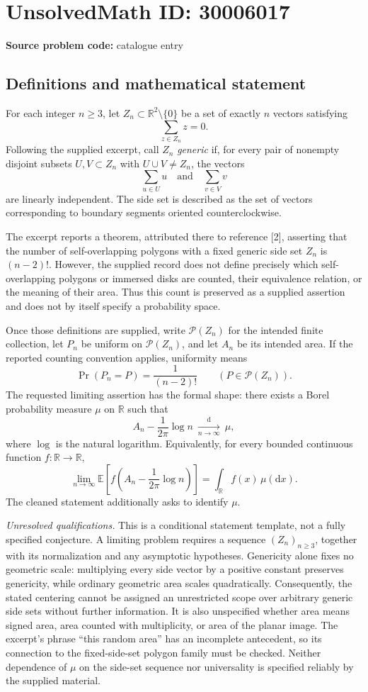 \documentclass[11pt]{article}
\newcommand{\R}{\mathbb{R}}
\newcommand{\E}{\mathbb{E}}
\begin{document}
\section*{UnsolvedMath ID: 30006017}
\textbf{Source problem code:} catalogue entry
\subsection{Definitions and mathematical statement}
For each integer \(n\geq 3\), let \(Z_n\subset\R^2\setminus\{0\}\) be a set of exactly \(n\) vectors satisfying
\[
\sum_{z\in Z_n}z=0.
\]
Following the supplied excerpt, call \(Z_n\) \emph{generic} if, for every pair of nonempty disjoint subsets \(U,V\subset Z_n\) with \(U\cup V\neq Z_n\), the vectors
\[
\sum_{u\in U}u\quad\text{and}\quad\sum_{v\in V}v
\]
are linearly independent. The side set is described as the set of vectors corresponding to boundary segments oriented counterclockwise.

The excerpt reports a theorem, attributed there to reference [2], asserting that the number of self-overlapping polygons with a fixed generic side set \(Z_n\) is \((n-2)!\). However, the supplied record does not define precisely which self-overlapping polygons or immersed disks are counted, their equivalence relation, or the meaning of their area. Thus this count is preserved as a supplied assertion and does not by itself specify a probability space.

Once those definitions are supplied, write \(\mathcal P(Z_n)\) for the intended finite collection, let \(P_n\) be uniform on \(\mathcal P(Z_n)\), and let \(A_n\) be its intended area. If the reported counting convention applies, uniformity means
\[
\Pr(P_n=P)=\frac{1}{(n-2)!}\qquad(P\in\mathcal P(Z_n)).
\]
The requested limiting assertion has the formal shape: there exists a Borel probability measure \(\mu\) on \(\R\) such that
\[
A_n-\frac{1}{2\pi}\log n\ \xrightarrow[n\to\infty]{\mathrm d}\ \mu,
\]
where \(\log\) is the natural logarithm. Equivalently, for every bounded continuous function \(f:\R\to\R\),
\[
\lim_{n\to\infty}\E\!\left[f\!\left(A_n-\frac{1}{2\pi}\log n\right)\right]
=\int_{\R}f(x)\,\mu(\mathrm dx).
\]
The cleaned statement additionally asks to identify \(\mu\).

\emph{Unresolved qualifications.} This is a conditional statement template, not a fully specified conjecture. A limiting problem requires a sequence \((Z_n)_{n\geq3}\), together with its normalization and any asymptotic hypotheses. Genericity alone fixes no geometric scale: multiplying every side vector by a positive constant preserves genericity, while ordinary geometric area scales quadratically. Consequently, the stated centering cannot be assigned an unrestricted scope over arbitrary generic side sets without further information. It is also unspecified whether area means signed area, area counted with multiplicity, or area of the planar image. The excerpt's phrase ``this random area'' has an incomplete antecedent, so its connection to the fixed-side-set polygon family must be checked. Neither dependence of \(\mu\) on the side-set sequence nor universality is specified reliably by the supplied material.
\end{document}
